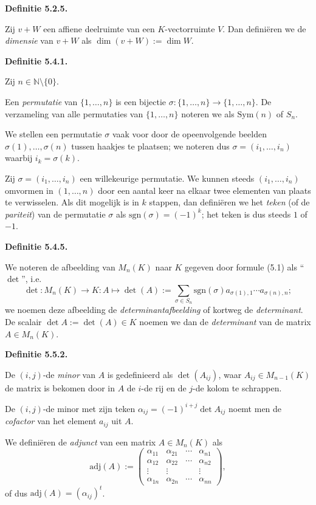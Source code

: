 \documentclass[10pt,a4paper]{article}
\newenvironment{res}[1]{%
  \par\noindent\textbf{Definitie #1.}~\ignorespaces
}{%
  \par\vspace{2pt}\normalfont
}
\begin{document}
\begin{res}{5.2.5}
Zij $v+W$ een affiene deelruimte van een $K$-vectorruimte $V$. Dan defini\"eren we de \textit{dimensie} van $v+W$ als $\dim(v+W):=\dim W$.
\end{res}

\begin{res}{5.4.1}
Zij $n\in\mathbb N\setminus\{0\}$.
\begin{myenum}
\item Een \textit{permutatie} van $\{1,\dots,n\}$ is een bijectie $\sigma:\{1,\dots,n\}\to\{1,\dots,n\}$. De verzameling van alle permutaties van $\{1,\dots,n\}$ noteren we als $\mathrm{Sym}(n)$ of $S_n$.
\item We stellen een permutatie $\sigma$ vaak voor door de opeenvolgende beelden $\sigma(1),\dots,\sigma(n)$ tussen haakjes te plaatsen; we noteren dus $\sigma=(i_1,\dots,i_n)$ waarbij $i_k=\sigma(k)$.
\item Zij $\sigma=(i_1,\dots,i_n)$ een willekeurige permutatie. We kunnen steeds $(i_1,\dots,i_n)$ omvormen in $(1,\dots,n)$ door een aantal keer na elkaar twee elementen van plaats te verwisselen. Als dit mogelijk is in $k$ stappen, dan defini\"eren we het \textit{teken} (of de \textit{pariteit}) van de permutatie $\sigma$ als $\mathrm{sgn}(\sigma)=(-1)^k$; het teken is dus steeds $1$ of $-1$.
\end{myenum}
\end{res}

\begin{res}{5.4.5}
We noteren de afbeelding van $M_n(K)$ naar $K$ gegeven door formule (5.1) als ``$\det$'', i.e.
\[
\det: M_n(K)\to K: A\mapsto \det(A):=\sum_{\sigma\in S_n} \mathrm{sgn}(\sigma)a_{\sigma(1),1}\cdots a_{\sigma(n),n};
\]
we noemen deze afbeelding de \textit{determinantafbeelding} of kortweg de \textit{determinant}. De scalair $\det A:=\det(A)\in K$ noemen we dan de \textit{determinant} van de matrix $A\in M_n(K)$.
\end{res}

\begin{res}{5.5.2}
\begin{myenum}
\item De $(i,j)$-de \textit{minor} van $A$ is gedefinieerd als $\det(A_{ij})$, waar $A_{ij}\in M_{n-1}(K)$ de matrix is bekomen door in $A$ de $i$-de rij en de $j$-de kolom te schrappen.
\item De $(i,j)$-de minor met zijn teken $\alpha_{ij}=(-1)^{i+j}\det A_{ij}$ noemt men de \textit{cofactor} van het element $a_{ij}$ uit $A$.
\item We defini\"eren de \textit{adjunct} van een matrix $A\in M_n(K)$ als
\[
\mathrm{adj}(A):=\begin{pmatrix}\alpha_{11}&\alpha_{21}&\cdots&\alpha_{n1}\\ \alpha_{12}&\alpha_{22}&\cdots&\alpha_{n2}\\ \vdots&\vdots& &\vdots\\ \alpha_{1n}&\alpha_{2n}&\cdots&\alpha_{nn}\end{pmatrix},
\]
of dus $\mathrm{adj}(A)=(\alpha_{ij})^t$.
\end{myenum}
\end{res}
\end{document}
